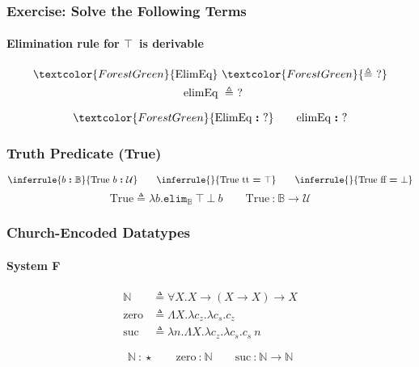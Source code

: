 \documentclass[mathserif,usenames,dvipsnames]{beamer}
\newcommand{\good}[1]{\textcolor{ForestGreen}{#1}}
\newcommand{\txt}[1]{\textrm{#1}}
\newcommand{\defeq}[0]{\ensuremath{\triangleq}}
\newcommand{\isterm}[2]{\ensuremath{#1 ~\textbf{{:}}~ #2}}
\newcommand{\eqtype}[2]{\ensuremath{#1 ~\textbf{=}~ #2}}
\newcommand{\Arr}[2]{\ensuremath{#1 \rightarrow #2}}
\newcommand{\Allv}[2]{\ensuremath{\forall #1. #2}}
\newcommand{\All}[1]{\Allv{X}{#1}}
\newcommand{\allv}[2]{\ensuremath{\Lambda #1. #2}}
\newcommand{\all}[1]{\allv{X}{#1}}
\newcommand{\funv}[2]{\ensuremath{\lambda #1. #2}}
\newcommand{\app}[2]{\ensuremath{#1~#2}}
\newcommand{\Type}[0]{\ensuremath{\mathcal{U}}}
\newcommand{\Unit}[0]{\ensuremath{\top}}
\newcommand{\Bot}[0]{\ensuremath{\bot}}
\newcommand{\Truek}[0]{\txt{True}}
\newcommand{\True}[1]{\ensuremath{\Truek~#1}}
\newcommand{\Bool}[0]{\ensuremath{\mathbb{B}}}
\newcommand{\true}[0]{\ensuremath{\txt{tt}}}
\newcommand{\false}[0]{\ensuremath{\txt{ff}}}
\newcommand{\elimBool}[3]{\ensuremath{\texttt{elim}_{\Bool}~#1~#2~#3}}
\newcommand{\Nat}[0]{\ensuremath{\mathbb{N}}}
\newcommand{\zero}[0]{\ensuremath{\txt{zero}}}
\newcommand{\suck}[0]{\ensuremath{\txt{suc}}}
\newcommand{\foldNatk}[0]{\ensuremath{\txt{fold}_\Nat}}
\begin{document}
\begin{frame}
\frametitle{Exercise: Solve the Following Terms}
\framesubtitle{Elimination rule for \Unit~is derivable}

\begin{align*}
\good{\txt{ElimEq}}~ &\good{\defeq~?} \\
\txt{elimEq}~ &\defeq~? \\
\end{align*}

$$
\good{\isterm{\txt{ElimEq}}{?}}
\qquad
\isterm{\txt{elimEq}}{?}
$$

\end{frame}

\begin{frame}
\frametitle{Truth Predicate (\Truek)}

$$
\inferrule{
  {\isterm{b}{\Bool}}
}
{\isterm{\True{b}}{\Type}}
\qquad
\inferrule{{}}
{\eqtype{\True{\true}}{\Unit}}
\qquad
\inferrule{{}}
{\eqtype{\True{\false}}{\Bot}}
$$
\dotfill
$$
\Truek \defeq \funv{b}{\elimBool{\Unit}{\Bot}{b}}
\qquad
\isterm{\Truek}{\Arr{\Bool}{\Type}}
$$

\end{frame}

\begin{frame}
\frametitle{Church-Encoded Datatypes}
\framesubtitle{System F}

\begin{align*}
\Nat &\defeq \All{\Arr{X}{\Arr{(\Arr{X}{X})}{X}}} \\
\zero &\defeq \all{\funv{c_z}{\funv{c_s}{c_z}}} \\
\suck &\defeq \funv{n}{\all{\funv{c_z}{\funv{c_s}{\app{c_s}{n}}}}}
\end{align*}

$$
\isterm{\Nat}{\star}
\qquad
\isterm{\zero}{\Nat}
\qquad
\isterm{\suck}{\Arr{\Nat}{\Nat}}
$$


\end{frame}
\end{document}
